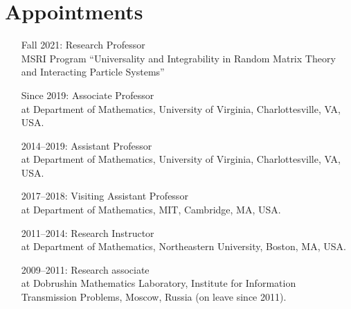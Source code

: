 \documentclass[letterpaper,11pt]{article}
\begin{document}
\section*{Appointments}

\begin{itemize}
	\item [Fall 2021:]
		  Research Professor
		  \\
		  MSRI Program ``Universality and Integrability in Random Matrix Theory and Interacting Particle Systems''
	\item
	      [Since 2019:]
	      Associate Professor\\ at Department of Mathematics, University
	      of Virginia, Charlottesville, VA, USA.
	\item
	      [2014--2019:]
	      Assistant Professor\\ at Department of Mathematics, University
	      of Virginia, Charlottesville, VA, USA.
	\item
	      [2017--2018:]
	      Visiting Assistant Professor\\ at Department of Mathematics, MIT, 
	      Cambridge, MA, USA.
	\item
	      [2011--2014:]
	      Research Instructor\\ at Department of Mathematics, Northeastern
	      University, Boston, MA, USA.
	\item
	      [2009--2011:]
	      Research associate\\ at Dobrushin Mathematics Laboratory,
	      Institute for Information Transmission Problems, Moscow, Russia (on leave
	      since 2011).
\end{itemize}
\end{document}
